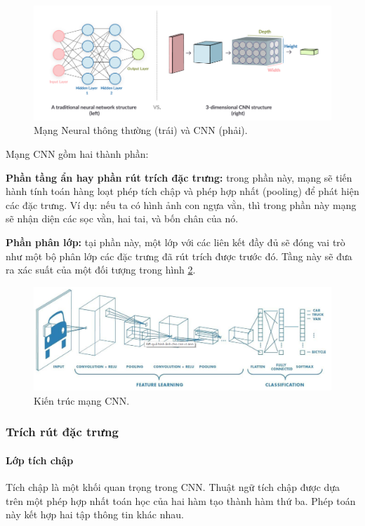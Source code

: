 \begin{figure}[H]
	\centering
	\includegraphics[width=1\linewidth]{images/neuronnetwork}
	\caption{Mạng Neural thông thường (trái) và CNN (phải).}
	\label{fig:neuronnetwork}
\end{figure}

Mạng CNN gồm hai thành phần:

\indent\indent \textbf{Phần tầng ẩn hay phần rút trích đặc trưng:} trong phần này, mạng sẽ tiến hành tính toán hàng loạt phép tích chập và phép hợp nhất (pooling) để phát hiện các đặc trưng. Ví dụ: nếu ta có hình ảnh con ngựa vằn, thì trong phần này mạng sẽ nhận diện các sọc vằn, hai tai, và bốn chân của nó.

\indent\indent  \textbf{Phần phân lớp:} tại phần này, một lớp với các liên kết đầy đủ sẽ đóng vai trò như một bộ phân lớp các đặc trưng đã rút trích được trước đó. Tầng này sẽ đưa ra xác suất của một đối tượng trong hình \ref{fig:kientruccnn}.
\begin{figure}[H]
	\centering
	\includegraphics[width=1\linewidth]{images/kientruccnn}
	\caption{Kiến trúc mạng CNN.}
	\label{fig:kientruccnn}
\end{figure}

\subsubsection{Trích rút đặc trưng}
\paragraph{Lớp tích chập}
Tích chập là một khối quan trọng trong CNN. Thuật ngữ tích chập được dựa trên một phép hợp nhất toán học của hai hàm tạo thành hàm thứ ba. Phép toán này kết hợp hai tập thông tin khác nhau.

